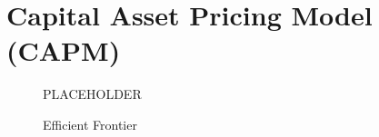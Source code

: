 \chapter{Capital Asset Pricing Model (CAPM)}



\begin{figure}
    \centering
    PLACEHOLDER
    \caption{Efficient Frontier}
    \label{fig:market}
\end{figure}


